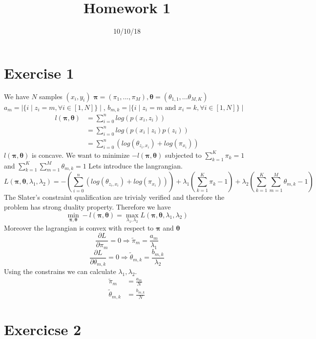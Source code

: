 \documentclass[]{article}
\title{Homework 1}
\date{10/10/18}
\begin{document}
\section{Exercise 1}
We have $N$ samples $(x_i,y_i)$
$\pmb{\pi} = (\pi_1, ..., \pi_M), \pmb{\theta} = (\theta_{1,1}, ... \theta_{M,K})$	\\
$a_m = \mid \{ i \mid  z_i = m, \forall i \in [1,N]\}\mid $, $b_{m,k} = \mid \{ i \mid  z_i = m \text{ and } x_i = k, \forall i \in [1,N]\}\mid $
\begin{align*}
l(\pmb{\pi}, \pmb{\theta}) &= \sum_{i=0}^n log(p(x_i,z_i)) \\
&= \sum_{i=0}^n log(p(x_i \mid  z_i)p(z_i))\\
&= \sum_{i=0}^n (log(\theta_{z_i,x_i}) + log(\pi_{x_i}))
\end{align*}
$l(\pmb{\pi}, \pmb{\theta})$ is concave. We want to minimize $- l(\pmb{\pi}, \pmb{\theta})$ subjected to $\sum_{k=1}^K \pi_k = 1$ and $\sum_{k=1}^K \sum_{m=1}^M \theta_{m,k} = 1$
Lets introduce the langrangian.
$$ L(\pmb{\pi}, \pmb{\theta}, \lambda_1, \lambda_2) = - (\sum_{i=0}^n (log(\theta_{z_i,x_i}) + log(\pi_{x_i}))) + \lambda_1(\sum_{k=1}^K \pi_k - 1) + \lambda_2(\sum_{k=1}^K \sum_{m=1}^M \theta_{m,k} - 1) $$
The Slater’s constraint qualification are trivialy verified and therefore the problem has strong duality property. Therefore we have
$$ \min_{\pmb{\pi}, \pmb{\theta}} - l(\pmb{\pi}, \pmb{\theta}) = \max_{\lambda_1, \lambda_2}  L(\pmb{\pi}, \pmb{\theta}, \lambda_1, \lambda_2) $$
Moreover the lagrangian is convex with respect to $\pmb{\pi}$ and $\pmb{\theta}$
$$ \frac{\partial L}{\partial \pi_m} = 0 \Rightarrow \tilde{\pi}_m = \frac{a_m}{\lambda_1}$$
$$ \frac{\partial L}{\partial \theta_{m,k}} = 0 \Rightarrow \tilde{\theta}_{m,k} = \frac{b_{m,k}}{\lambda_2}$$
Using the constrains we can calculate $\lambda_1, \lambda_2$.
\begin{align*}
\tilde{\pi}_m &= \frac{a_m}{N} \\
\tilde{\theta}_{m,k} &= \frac{b_{m,k}}{N}
\end{align*}

\section{Exercicse 2}
\end{document}
